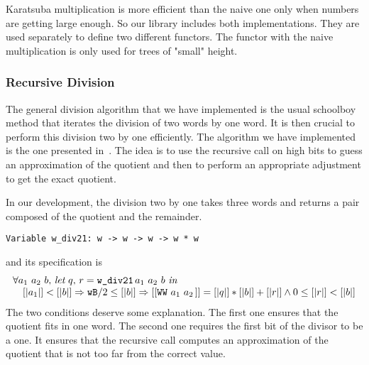 Karatsuba multiplication is more efficient than the naive one
only when numbers are getting large enough. So our library
includes both implementations. They are used separately to define two
different functors. The functor with the naive multiplication is only used 
for trees of "small" height. 

\subsubsection{Recursive Division}
The general division algorithm that we have implemented is the usual schoolboy 
method that iterates the division of two words by one word. 
It is then crucial to perform this division two by one efficiently. 
The algorithm we have implemented is the one presented in~\cite{RecDiv}.
The idea is to use the recursive call on high bits to guess an approximation 
of the quotient and  then to perform an appropriate adjustment to get the exact quotient.

In our development, the division two by one takes
three words and returns a pair composed of the quotient and the remainder.
\begin{verbatim}
Variable w_div21: w -> w -> w -> w * w
\end{verbatim}
and its specification is 
$$\begin{array}{l}
\forall a_1\,\, a_2\,\, b,\, \textit{let}\,\, q,\, r = \texttt{w\_div21}\, a_1\,\, a_2\,\, b\,\, \textit{in}\,\, \\
\hskip10pt [|a_1|] < [|b|] \Rightarrow {\texttt{wB}} / 2 \le [|b|] \Rightarrow  [[\texttt{WW}\,\,a_1\,\,a_2\,]] = [|q|] * [|b|] + [|r|] \land 0 \le [|r|] < [|b|]
\end{array}
$$
The two conditions deserve some explanation.
The first one ensures that the quotient fits in one word.
The second one requires the first bit of the divisor to be a 
one. It ensures that the recursive call computes an approximation 
of the quotient that is not too far from the correct value.


